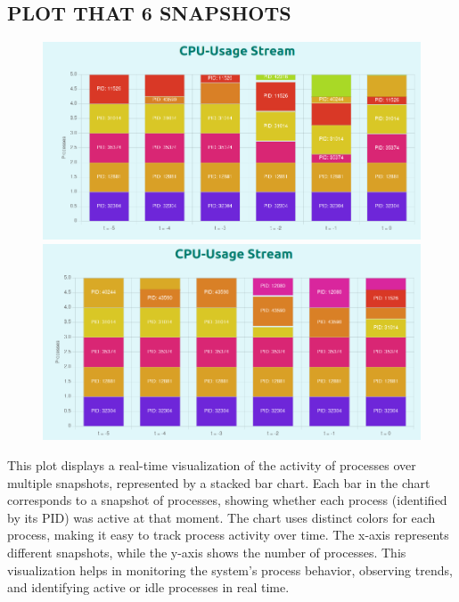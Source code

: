 \documentclass[12pt]{article}
\begin{document}
\subsection{PLOT THAT 6 SNAPSHOTS}
\begin{figure}[H]
    \centering
    \begin{minipage}{0.45\textwidth}
        \centering
        \includegraphics[width=\textwidth]{logos and images/plot2_1.png}
    \end{minipage}
    \hfill
    \begin{minipage}{0.45\textwidth}
        \centering
        \includegraphics[width=\textwidth]{logos and images/plot2_2.png}
    \end{minipage}
    \caption{}
\end{figure}

This plot displays a real-time visualization of the activity of processes over multiple snapshots, represented by a stacked bar chart. Each bar in the chart corresponds to a snapshot of processes, showing whether each process (identified by its PID) was active at that moment. The chart uses distinct colors for each process, making it easy to track process activity over time. The x-axis represents different snapshots, while the y-axis shows the number of processes. This visualization helps in monitoring the system’s process behavior, observing trends, and identifying active or idle processes in real time.
\end{document}
